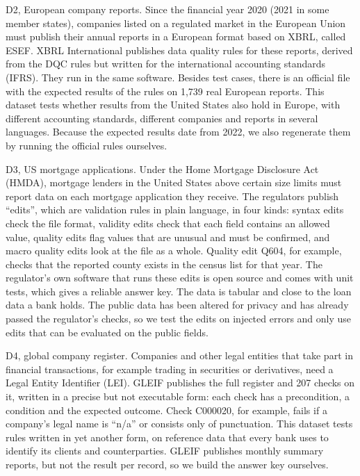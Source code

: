 \documentclass[11pt,a4paper]{article}
\begin{document}
D2, European company reports. Since the financial year 2020 (2021 in some member states), companies listed on a regulated market in the European Union must publish their annual reports in a European format based on XBRL, called ESEF. XBRL International publishes data quality rules for these reports, derived from the DQC rules but written for the international accounting standards (IFRS). They run in the same software. Besides test cases, there is an official file with the expected results of the rules on 1{,}739 real European reports. This dataset tests whether results from the United States also hold in Europe, with different accounting standards, different companies and reports in several languages. Because the expected results date from 2022, we also regenerate them by running the official rules ourselves.

D3, US mortgage applications. Under the Home Mortgage Disclosure Act (HMDA), mortgage lenders in the United States above certain size limits must report data on each mortgage application they receive. The regulators publish ``edits'', which are validation rules in plain language, in four kinds: syntax edits check the file format, validity edits check that each field contains an allowed value, quality edits flag values that are unusual and must be confirmed, and macro quality edits look at the file as a whole. Quality edit Q604, for example, checks that the reported county exists in the census list for that year. The regulator's own software that runs these edits is open source and comes with unit tests, which gives a reliable answer key. The data is tabular and close to the loan data a bank holds. The public data has been altered for privacy and has already passed the regulator's checks, so we test the edits on injected errors and only use edits that can be evaluated on the public fields.

D4, global company register. Companies and other legal entities that take part in financial transactions, for example trading in securities or derivatives, need a Legal Entity Identifier (LEI). GLEIF publishes the full register and 207 checks on it, written in a precise but not executable form: each check has a precondition, a condition and the expected outcome. Check C000020, for example, fails if a company's legal name is ``n/a'' or consists only of punctuation. This dataset tests rules written in yet another form, on reference data that every bank uses to identify its clients and counterparties. GLEIF publishes monthly summary reports, but not the result per record, so we build the answer key ourselves.
\end{document}
